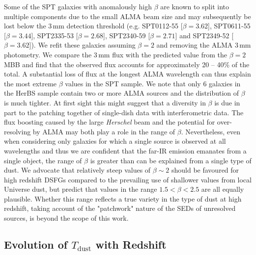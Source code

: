 Some of the SPT galaxies with anomalously high $\beta$ are known to split into multiple components due to the small ALMA beam size and may subsequently be lost below the 3\,mm detection threshold (e.g. SPT0112-55 [$\beta = 3.62$], SPT0611-55 [$\beta = 3.44$], SPT2335-53 [$\beta = 2.68$], SPT2340-59 [$\beta = 2.71$] and SPT2349-52 [$\beta = 3.62$]). We refit these galaxies assuming $\beta = 2$ and removing the ALMA 3\,mm photometry. We compare the 3\,mm flux with the predicted value from the $\beta = 2$ MBB and find that the observed flux accounts for approximately 20 -- 40\% of the total. A substantial loss of flux at the longest ALMA wavelength can thus explain the most extreme $\beta$ values in the SPT sample. We note that only {\color{red} 6} galaxies in the HerBS sample contain two or more ALMA sources and the distribution of $\beta$ is much tighter. At first sight this might suggest that a diversity in $\beta$ is due in part to the patching together of single-dish data with interferometric data. The flux boosting caused by the large \textit{Herschel} beam and the potential for over-resolving by ALMA may both play a role in the range of $\beta$. Nevertheless, even when considering only galaxies for which a single source is observed at all wavelengths and thus we are confident that the far-IR emission emanates from a single object, the range of $\beta$ is greater than can be explained from a single type of dust. We advocate that relatively steep values of $\beta \sim 2$ should be favoured for high redshift DSFGs compared to the prevailing use of shallower values from local Universe dust, but predict that values in the range $1.5 < \beta < 2.5$ are all equally plausible. Whether this range reflects a true variety in the type of dust at high redshift, taking account of the "patchwork" nature of the SEDs of unresolved sources, is beyond the scope of this work.

\subsection{Evolution of $T_{\textrm{dust}}$ with Redshift}

